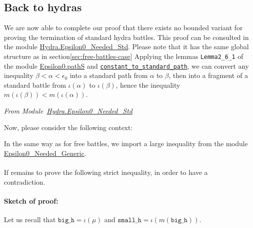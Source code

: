 \subsection{Back to hydras}
\label{sec:standard-battles-cases}
We are now able to complete our proof that there exists no bounded variant for proving the termination of standard hydra battles. This proof can
be consulted in the module 
\href{../theories/html/hydras.Hydra.Epsilon0_Needed_Std.html}{Hydra.Epsilon0\_Needed\_Std}.
Please note that it has the same global structure as in section\ref{sec:free-battles-case} 
Applying the  lemmas  \texttt{Lemma2\_6\_1} of the module 
\href{../theories/html/hydras.Epsilon0.Paths.html\#Lemma2_6_1}%
{Epsilon0.pathS}   and 
\href{../theories/html/hydras.Epsilon0.Paths.html\#constant_to_standard_path}%
{\texttt{constant\_to\_standard\_path}},
we can convert any inequality $\beta<\alpha<\epsilon_0$ into a standard path from
$\alpha$ to  $\beta$, then into a fragment of a standard battle from 
$\iota(\alpha)$ to $\iota(\beta)$, hence the inequality $m(\iota(\beta))<m(\iota(\alpha))$.


\vspace{4pt}
\emph{From Module~\href{../theories/html/hydras.Hydra.Epsilon0_Needed_Std.html\#LT_to_standard_battle}{Hydra.Epsilon0\_Needed\_Std}}




Now, please consider the following context:



In the same way as for free battles, we import a large inequality 
from 
the module \href{../theories/html/hydras.Hydra.Epsilon0_Needed_Generic.html}{Epsilon0\_Needed\_Generic}.





\paragraph*{} If remains to prove the following strict inequality, in order to have a contradiction.




\paragraph*{Sketch of proof:} Let us recall that $\texttt{big\_h} = \iota(\mu)$
 and $\texttt{small\_h} = \iota (m (\texttt{big\_h}))$.


